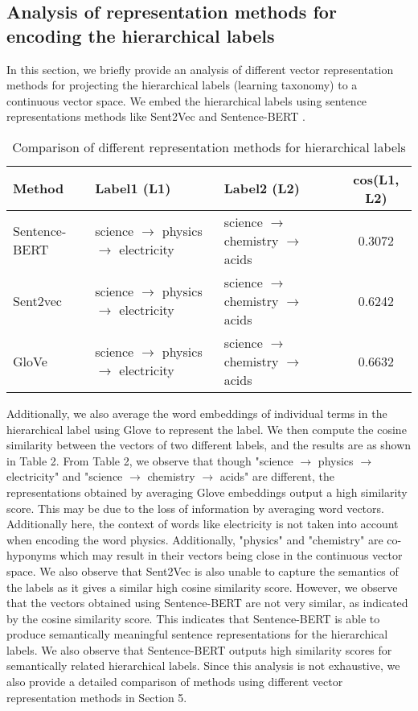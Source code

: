 \documentclass[runningheads, envcountsame, a4paper]{llncs}
\begin{document}
\subsection{Analysis of representation methods for encoding the hierarchical labels}
In this section, we briefly provide an analysis of different vector representation methods for projecting the hierarchical labels (learning taxonomy) to a continuous vector space. We embed the hierarchical labels using sentence representations methods like Sent2Vec \cite{pagliardini2017unsupervised} and Sentence-BERT \cite{reimers-gurevych-2019-sentence}.
             \begin{table}
       \small
 \centering
\caption{Comparison of different representation methods for hierarchical labels}\label{tab1}
\begin{tabular}{p{4.7cm}|p{3cm}|p{3cm}|c}
 Method & Label1 (L1)& Label2 (L2) & cos(L1, L2)\\
\hline\hline
Sentence-BERT &  science $\xrightarrow{}$ physics $\xrightarrow{}$ electricity &  science $\xrightarrow{}$ chemistry $\xrightarrow{}$ acids & 0.3072\\ 
Sent2vec & science $\xrightarrow{}$ physics $\xrightarrow{}$ electricity &  science $\xrightarrow{}$ chemistry $\xrightarrow{}$ acids & 0.6242\\ 
GloVe & science $\xrightarrow{}$ physics $\xrightarrow{}$ electricity &  science $\xrightarrow{}$ chemistry $\xrightarrow{}$ acids & 0.6632\\ 

\hline

\end{tabular}
\end{table}Additionally, we also average the word embeddings of individual terms in the hierarchical label using Glove to represent the label. We then compute the cosine similarity between the vectors of two different labels, and the results are as shown in Table 2. From Table 2, we observe that though "science $\xrightarrow{}$ physics $\xrightarrow{}$ electricity" and "science $\xrightarrow{}$ chemistry $\xrightarrow{}$ acids" are different, the representations obtained by averaging Glove embeddings output a high similarity score. This may be due to the loss of information by averaging word vectors. Additionally here, the context of words like electricity is not taken into account when encoding the word physics. Additionally, "physics" and "chemistry" are co-hyponyms which may result in their vectors being close in the continuous vector space. We also observe that Sent2Vec is also unable to capture the semantics of the labels as it gives a similar high cosine similarity score. However, we observe that the vectors obtained using Sentence-BERT are not very similar, as indicated by the cosine similarity score. This indicates that Sentence-BERT is able to produce semantically meaningful sentence representations for the hierarchical labels. We also observe that Sentence-BERT outputs high similarity scores for semantically related hierarchical labels. Since this analysis is not exhaustive, we also provide a detailed comparison of methods using different vector representation methods in Section 5.
\end{document}
